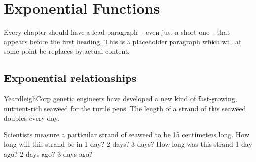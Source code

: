 \chapter{Exponential Functions}
\label{ch:expofunc}



Every chapter should have a lead paragraph -- even just a short one -- that appears before the first heading. This is a placeholder paragraph which will at some point be replaces by actual content.

%

\section{Exponential relationships}
\label{sec:exporelationships}

\begin{boxedexplore}
YeardleighCorp genetic engineers have developed a new kind of fast-growing, nutrient-rich seaweed for the turtle pens. The length of a strand of this seaweed doubles every day.

Scientists measure a particular strand of seaweed to be 15 centimeters long. How long will this strand be in 1 day? 2 days? 3 days? How long was this strand 1 day ago? 2 days ago? 3 days ago?
\end{boxedexplore}

